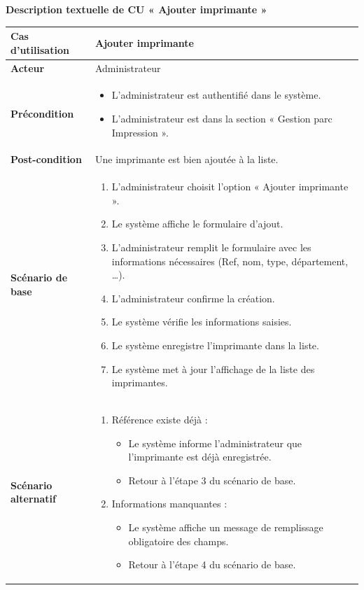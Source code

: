 \documentclass[a4paper,11pt]{report}
\begin{document}
\newpage
\textbf{Description textuelle de CU « Ajouter imprimante »}

\begin{tabularx}{\textwidth}{|>{\bfseries}l|X|}
\hline
Cas d’utilisation    & Ajouter imprimante \\
\hline
Acteur               & Administrateur \\
\hline
Précondition         &
\begin{itemize}[left=0pt]
  \item L’administrateur est authentifié dans le système.
  \item L’administrateur est dans la section « Gestion parc Impression ».
\end{itemize} \\
\hline
Post-condition       & Une imprimante est bien ajoutée à la liste. \\
\hline
Scénario de base     &
\begin{enumerate}[left=0pt]
  \item L’administrateur choisit l’option « Ajouter imprimante ».
  \item Le système affiche le formulaire d’ajout.
  \item L’administrateur remplit le formulaire avec les informations nécessaires (Ref, nom, type, département, …).
  \item L’administrateur confirme la création.
  \item Le système vérifie les informations saisies.
  \item Le système enregistre l’imprimante dans la liste.
  \item Le système met à jour l’affichage de la liste des imprimantes.
\end{enumerate} \\
\hline
Scénario alternatif  &
\begin{enumerate}[label=\arabic*.a,wide=0pt,leftmargin=0pt]
  \item[5.a] Référence existe déjà :
    \begin{itemize}[leftmargin=1em]
      \item Le système informe l’administrateur que l’imprimante est déjà enregistrée.
      \item Retour à l’étape 3 du scénario de base.
    \end{itemize}
  \item[5.b] Informations manquantes :
    \begin{itemize}[leftmargin=1em]
      \item Le système affiche un message de remplissage obligatoire des champs.
      \item Retour à l’étape 4 du scénario de base.
    \end{itemize}
\end{enumerate} \\
\hline
\end{tabularx}
\end{document}
